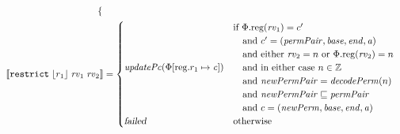 \documentclass{article}
\newcommand{\update}[2]{[#1 \mapsto #2]}
\newcommand{\sem}[1]{\left\llbracket #1 \right\rrbracket}
\newcommand{\var}[1]{\mathit{#1}}
\newcommand{\rv}{\var{rv}}
\newcommand{\gl}{\var{g}}
\newcommand{\addr}{\var{a}}
\newcommand{\start}{\var{base}}
\newcommand{\addrend}{\var{end}}
\newcommand{\perm}{\var{perm}}
\newcommand{\permp}{\var{permPair}}
\newcommand{\stdcap}[1][(\perm,\gl)]{\left(#1,\start,\addrend,\addr \right)}
\newcommand{\plainproj}[1]{\mathrm{#1}}
\newcommand{\memreg}[1][\Phi]{#1.\plainproj{reg}}
\newcommand{\updateReg}[3][\Phi]{#1\update{\plainproj{reg}.#2}{#3}}
\newcommand{\failed}{\textsl{failed}}
\newcommand{\plainfun}[2]{
  \ifthenelse{\equal{#2}{}}
             {\mathit{#1}}
             {\mathit{#1}(#2)}
}
\newcommand{\decodePerm}{\plainfun{decodePerm}{}}
\newcommand{\stdUpdatePc}[1]{\plainfun{updatePc}{#1}}
\newcommand{\ints}{\mathbb{Z}}
\newcommand{\refreg}[1]{\lfloor #1 \rfloor}
\newcommand{\zinstr}[1]{\mathtt{#1}}
\newcommand{\threeinstr}[4]{\zinstr{#1} \; #2 \; #3 \; #4}
\newcommand{\restrict}[3]{\threeinstr{restrict}{#1}{#2}{#3}}
\begin{document}
\begin{align*}
\begin{cases}
                                             \end{cases} 
\\
  \sem{\restrict{\refreg{r_1}}{\rv_1}{\rv_2}}           & =
                                             \begin{cases}
                                               \stdUpdatePc{\updateReg{r_1}{\var{c}}}  &
                                                 \arraycolsep=0pt
                                                 \begin{array}{l}
                                                   \text{if $\memreg(\rv_1) = c'$}\\
                                                   \quad\text{and $c' = \stdcap[\permp]$}\\
                                                   \quad\text{and either $\rv_2 = n$ or $\memreg(\rv_2) = n$}\\
                                                   \quad\text{and in either case $n \in \ints$}\\
                                                   \quad\text{and $\var{newPermPair} = \decodePerm(n)$}\\
                                                   \quad\text{and $\var{newPermPair} \sqsubseteq \permp$}\\
                                                   \quad\text{and $c = (\var{newPerm},\start,\addrend,\addr)$}
                                                 \end{array}\\
                                               \failed                   & \text{otherwise}
                                             \end{cases} 
\end{align*}
\end{document}
